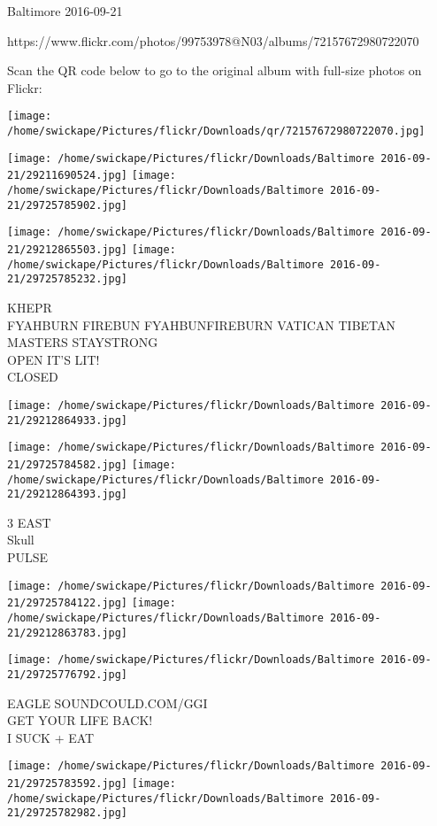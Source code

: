 \documentclass[10pt,letterpaper]{article}
\begin{document}
Baltimore 2016-09-21

https://www.flickr.com/photos/99753978@N03/albums/72157672980722070

Scan the QR code below to go to the original album with full-size photos on Flickr:

\texttt{[image: /home/swickape/Pictures/flickr/Downloads/qr/72157672980722070.jpg]}
\pagebreak

\texttt{[image: /home/swickape/Pictures/flickr/Downloads/Baltimore 2016-09-21/29211690524.jpg]}
\texttt{[image: /home/swickape/Pictures/flickr/Downloads/Baltimore 2016-09-21/29725785902.jpg]}

\texttt{[image: /home/swickape/Pictures/flickr/Downloads/Baltimore 2016-09-21/29212865503.jpg]}
\texttt{[image: /home/swickape/Pictures/flickr/Downloads/Baltimore 2016-09-21/29725785232.jpg]}

KHEPR\\
FYAHBURN FIREBUN FYAHBUNFIREBURN VATICAN TIBETAN MASTERS STAYSTRONG\\
OPEN IT'S LIT!\\
CLOSED
\pagebreak

\texttt{[image: /home/swickape/Pictures/flickr/Downloads/Baltimore 2016-09-21/29212864933.jpg]}

\vspace{0.25in}
\texttt{[image: /home/swickape/Pictures/flickr/Downloads/Baltimore 2016-09-21/29725784582.jpg]}
\texttt{[image: /home/swickape/Pictures/flickr/Downloads/Baltimore 2016-09-21/29212864393.jpg]}

3 EAST\\
Skull\\
PULSE
\pagebreak

\texttt{[image: /home/swickape/Pictures/flickr/Downloads/Baltimore 2016-09-21/29725784122.jpg]}
\texttt{[image: /home/swickape/Pictures/flickr/Downloads/Baltimore 2016-09-21/29212863783.jpg]}

\vspace{0.25in}
\texttt{[image: /home/swickape/Pictures/flickr/Downloads/Baltimore 2016-09-21/29725776792.jpg]}

EAGLE SOUNDCOULD.COM/GGI\\
GET YOUR LIFE BACK!\\
I SUCK + EAT
\pagebreak

\texttt{[image: /home/swickape/Pictures/flickr/Downloads/Baltimore 2016-09-21/29725783592.jpg]}
\texttt{[image: /home/swickape/Pictures/flickr/Downloads/Baltimore 2016-09-21/29725782982.jpg]}
\end{document}
